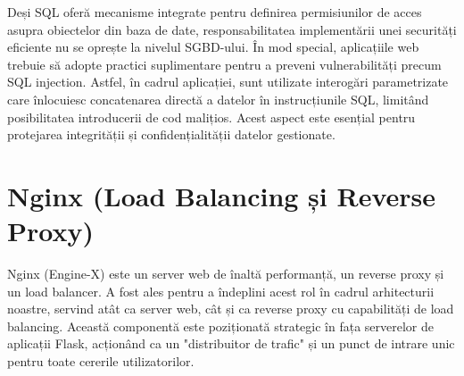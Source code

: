 \documentclass[12pt, a4paper, oneside, romanian]{teza-upb}
\begin{document}
Deși SQL \cite{sql} oferă mecanisme integrate pentru definirea permisiunilor de acces asupra obiectelor din baza de date, responsabilitatea implementării unei securități eficiente nu se oprește la nivelul SGBD-ului. În mod special, aplicațiile web trebuie să adopte practici suplimentare pentru a preveni vulnerabilități precum SQL injection. Astfel, în cadrul aplicației, sunt utilizate interogări parametrizate care înlocuiesc concatenarea directă a datelor în instrucțiunile SQL, limitând posibilitatea introducerii de cod malițios. Acest aspect este esențial pentru protejarea integrității și confidențialității datelor gestionate.


\section{Nginx (Load Balancing și Reverse Proxy)}
Nginx (Engine-X) \cite{ng}  este un server web de înaltă performanță, un reverse proxy și un load balancer. A fost ales pentru a îndeplini acest rol în cadrul arhitecturii noastre, servind atât ca server web, cât și ca reverse proxy cu capabilități de load balancing. Această componentă este poziționată strategic în fața serverelor de aplicații Flask, acționând ca un "distribuitor de trafic" și un punct de intrare unic pentru toate cererile utilizatorilor.
\end{document}
